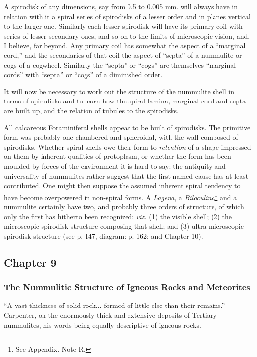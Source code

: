 \documentclass[a4paper, 12pt, oneside]{article}
\begin{document}
A spirodisk of any dimensions, say from 0.5 to 0.005 mm. will always have in relation with it a spiral series of spirodisks of a lesser order and in planes vertical to the larger one. Similarly each lesser spirodisk will have its primary coil with series of lesser secondary ones, and so on to the limits of microscopic vision, and, I believe, far beyond. Any primary coil has somewhat the aspect of a ``marginal cord,'' and the secondaries of that coil the aspect of ``septa'' of a nummulite or cogs of a cogwheel. Similarly the ``septa'' or ``cogs'' are themselves ``marginal cords'' with ``septa'' or ``cogs'' of a diminished order.

It will now be necessary to work out the structure of the nummulite shell in terms of spirodisks and to learn how the spiral lamina, marginal cord and septa are built up, and the relation of tubules to the spirodisks.

All calcareous Foraminiferal shells appear to be built of spirodisks. The primitive form was probably one-chambered and spheroidal, with the wall composed of spirodisks. Whether spiral shells owe their form to \emph{retention} of a shape impressed on them by inherent qualities of protoplasm, or whether the form has been moulded by forces of the environment it is hard to say: the antiquity and universality of nummulites rather suggest that the first-named cause has at least contributed. One might then suppose the assumed inherent spiral tendency to have become overpowered in non-spiral forms. A \emph{Lagena}, a \emph{Biloculina}\footnote{See Appendix. Note R.} and a nummulite certainly have two, and probably three orders of structure, of which only the first has hitherto been recognized: \emph{viz.} (1) the visible shell; (2) the microscopic spirodisk structure composing that shell; and (3) ultra-microscopic spirodisk structure (see p. 147, diagram: p. 162: and Chapter 10).
\clearpage
\subsection{Chapter 9}
\subsubsection{The Nummulitic Structure of Igneous Rocks and Meteorites}
\begin{displayquote}
``A vast thickness of solid rock... formed of little else than their remains.'' Carpenter, on the enormously thick and extensive deposits of Tertiary nummulites, his words being equally descriptive of igneous rocks.
\end{displayquote}
\end{document}
